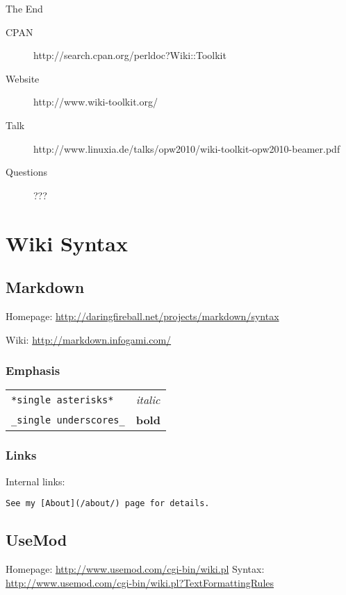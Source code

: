 \begin{frame}{The End}
 \begin{description}
  \item[CPAN] http://search.cpan.org/perldoc?Wiki::Toolkit
  \item[Website] http://www.wiki-toolkit.org/
  \item[Talk]
    http://www.linuxia.de/talks/opw2010/wiki-toolkit-opw2010-beamer.pdf
   \item[Questions] ???
 \end{description}
\end{frame}

\section{Wiki Syntax}
\subsection{Markdown}
Homepage: \url{http://daringfireball.net/projects/markdown/syntax}

Wiki: \url{http://markdown.infogami.com/}

\subsubsection{Emphasis}

\begin{tabular}{ll}
\verb|*single asterisks*| & \textit{italic} \\
\verb|_single underscores_| & \textbf{bold} \\
\end{tabular}


\subsubsection{Links}
Internal links:

\begin{verbatim}
See my [About](/about/) page for details.
\end{verbatim}

\subsection{UseMod}
Homepage: \url{http://www.usemod.com/cgi-bin/wiki.pl}
Syntax: \url{http://www.usemod.com/cgi-bin/wiki.pl?TextFormattingRules}

